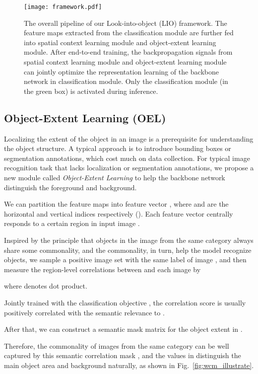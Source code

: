 \documentclass[10pt,twocolumn,letterpaper]{article}
\begin{document}
\begin{figure*}[!ht]
    \centering
    \texttt{[image: framework.pdf]}
    \caption{The overall pipeline of our Look-into-object (LIO) framework. The feature maps  extracted from the classification module are further fed into spatial context learning module and object-extent learning module. After end-to-end training, the backpropagation signals from spatial context learning module and object-extent learning module can jointly optimize the representation learning of the backbone network in classification module. Only the classification module (in the green box) is activated during inference.} 
    \label{fig:framework}
\end{figure*}

\subsection{Object-Extent Learning (OEL)}

Localizing the extent of the object in an image is a prerequisite for understanding the object structure. A typical approach is to introduce bounding boxes or segmentation annotations, which cost much on data collection. For typical image recognition task that lacks localization or segmentation annotations, 
we propose a new module called \textit{Object-Extent Learning} to help the backbone network distinguish the foreground and background.

We can partition the feature maps  into  feature vector , where  and  are the horizontal and vertical indices respectively (). Each feature vector centrally responds to a certain region in input image . 

Inspired by the principle that objects in the image from the same category always share some commonality, and the commonality, in turn, help the model recognize objects, we sample a positive image set  with the same label  of image , and then measure the region-level correlations between  and each image  by

where  denotes dot product.

Jointly trained with the classification objective , the correlation score  is usually positively correlated with the semantic relevance to . 

After that, we can construct a  semantic mask matrix  for the object extent in .

Therefore, the commonality of images from the same category can be well captured by this semantic correlation mask , and the values in  distinguish the main object area and background naturally, as shown in Fig.~\ref{fig:wcm_illustrate}. 
\end{document}
